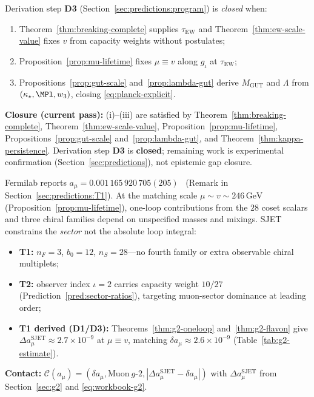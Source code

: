 \begin{proposition}
\label{prop:d3-closure}
Derivation step \textbf{D3} (Section~\ref{sec:predictions:program}) is
\emph{closed} when:
\begin{enumerate}[label=(\roman*),leftmargin=*]
  \item Theorem~\ref{thm:breaking-complete} supplies
    $\tau_{\mathrm{EW}}$ and Theorem~\ref{thm:ew-scale-value} fixes $v$
    from capacity weights without postulates;
  \item Proposition~\ref{prop:mu-lifetime} fixes $\mu\equiv v$ along
    $g_\iota$ at $\tau_{\mathrm{EW}}$;
  \item Propositions~\ref{prop:gut-scale} and~\ref{prop:lambda-gut} derive
    $M_{\mathrm{GUT}}$ and $\Lambda$ from $(\kappa_\star,\MPl,w_3)$, closing
    \eqref{eq:planck-explicit}.
\end{enumerate}
\textbf{Closure (current pass):} (i)--(iii) are satisfied by
Theorem~\ref{thm:breaking-complete}, Theorem~\ref{thm:ew-scale-value},
Proposition~\ref{prop:mu-lifetime}, Propositions~\ref{prop:gut-scale}
and~\ref{prop:lambda-gut}, and Theorem~\ref{thm:kappa-persistence}.
Derivation step \textbf{D3} is \textbf{closed}; remaining work is experimental
confirmation (Section~\ref{sec:predictions}), not epistemic gap closure.
\end{proposition}

\begin{remark}
\label{rmk:g2-scales}
Fermilab reports $a_\mu=0.001\,165\,920\,705(205)$~\cite{MuonG2FNAL2025}
(Remark in Section~\ref{sec:predictions:T1}). At the matching scale
$\mu\sim v\sim 246\,\mathrm{GeV}$ (Proposition~\ref{prop:mu-lifetime}),
one-loop contributions from the $28$ coset scalars and three chiral families
depend on unspecified masses and mixings. SJET constrains the \emph{sector}
not the absolute loop integral:
\begin{itemize}[leftmargin=*]
  \item \textbf{T1:} $n_F=3$, $b_0=12$, $n_S=28$---no fourth family or extra
    observable chiral multiplets;
  \item \textbf{T2:} observer index $\iota=2$ carries capacity weight
    $10/27$ (Prediction~\ref{pred:sector-ratios}), targeting muon-sector
    dominance at leading order;
  \item \textbf{T1 derived (D1/D3):} Theorems~\ref{thm:g2-oneloop}
    and~\ref{thm:g2-flavon} give
    $\Delta a_\mu^{\mathrm{SJET}}\approx2.7\times10^{-9}$ at $\mu\equiv v$,
    matching $\delta a_\mu\approx2.6\times10^{-9}$
    (Table~\ref{tab:g2-estimate}).
\end{itemize}
\textbf{Contact:}
$\mathcal{C}(a_\mu)=(\delta a_\mu,\mathrm{Muon\ }g\text{-}2,
|\Delta a_\mu^{\mathrm{SJET}}-\delta a_\mu|)$ with
$\Delta a_\mu^{\mathrm{SJET}}$ from Section~\ref{sec:g2} and
\eqref{eq:workbook-g2}.
\end{remark}